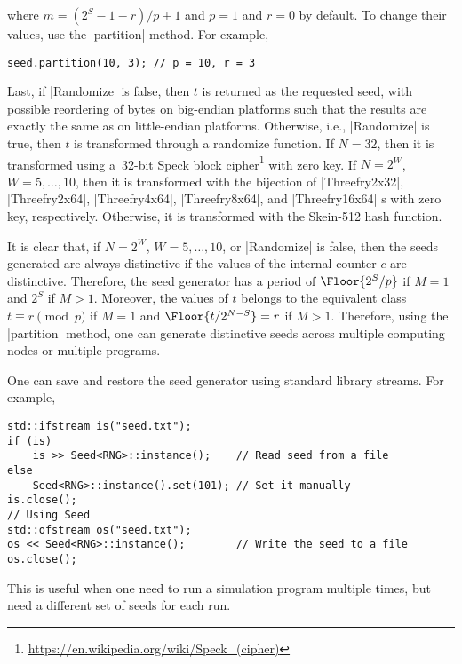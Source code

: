 where $m = (2^S - 1 - r) / p + 1$ and $p = 1$ and $r = 0$ by default. To change
their values, use the |partition| method. For example,
\begin{verbatim}
seed.partition(10, 3); // p = 10, r = 3
\end{verbatim}
Last, if |Randomize| is false, then $t$ is returned as the requested seed, with
possible reordering of bytes on big-endian platforms such that the results are
exactly the same as on little-endian platforms. Otherwise, i.e., |Randomize| is
true, then $t$ is transformed through a randomize function. If $N = 32$, then
it is transformed using a~32-bit Speck block
cipher\footnote{\url{https://en.wikipedia.org/wiki/Speck_(cipher)}} with zero
key. If $N = 2^W$, $W = 5,\dots,10$, then it is transformed with the bijection
of |Threefry2x32|, |Threefry2x64|, |Threefry4x64|, |Threefry8x64|, and
|Threefry16x64| \rng{}s with zero key, respectively. Otherwise, it is
transformed with the Skein-512 hash function.

It is clear that, if $N = 2^W$, $W = 5,\dots,10$, or |Randomize| is false, then
the seeds generated are always distinctive if the values of the internal
counter $c$ are distinctive. Therefore, the seed generator has a period of
$\Floor{2^S / p}$ if $M = 1$ and $2^S$ if $M > 1$. Moreover, the values of $t$
belongs to the equivalent class $t \equiv r \pmod{p}$ if $M = 1$ and $\Floor{t
/ 2^{N - S}} = r$ if $M > 1$. Therefore, using the |partition| method, one can
generate distinctive seeds across multiple computing nodes or multiple
programs.

One can save and restore the seed generator using standard library streams. For
example,
\begin{verbatim}
std::ifstream is("seed.txt");
if (is)
    is >> Seed<RNG>::instance();    // Read seed from a file
else
    Seed<RNG>::instance().set(101); // Set it manually
is.close();
// Using Seed
std::ofstream os("seed.txt");
os << Seed<RNG>::instance();        // Write the seed to a file
os.close();
\end{verbatim}
This is useful when one need to run a simulation program multiple times, but
need a different set of seeds for each run.

